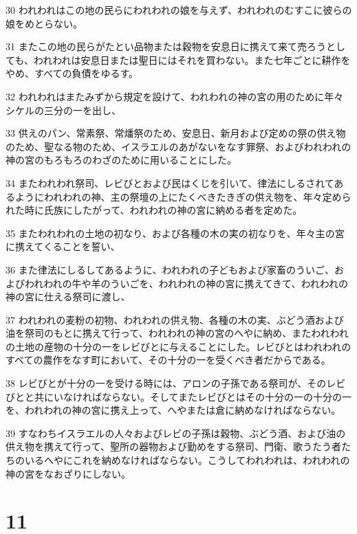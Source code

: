 \par 30 われわれはこの地の民らにわれわれの娘を与えず、われわれのむすこに彼らの娘をめとらない。
\par 31 またこの地の民らがたとい品物または穀物を安息日に携えて来て売ろうとしても、われわれは安息日または聖日にはそれを買わない。また七年ごとに耕作をやめ、すべての負債をゆるす。
\par 32 われわれはまたみずから規定を設けて、われわれの神の宮の用のために年々シケルの三分の一を出し、
\par 33 供えのパン、常素祭、常燔祭のため、安息日、新月および定めの祭の供え物のため、聖なる物のため、イスラエルのあがないをなす罪祭、およびわれわれの神の宮のもろもろのわざのために用いることにした。
\par 34 またわれわれ祭司、レビびとおよび民はくじを引いて、律法にしるされてあるようにわれわれの神、主の祭壇の上にたくべきたきぎの供え物を、年々定められた時に氏族にしたがって、われわれの神の宮に納める者を定めた。
\par 35 またわれわれの土地の初なり、および各種の木の実の初なりを、年々主の宮に携えてくることを誓い、
\par 36 また律法にしるしてあるように、われわれの子どもおよび家畜のういご、およびわれわれの牛や羊のういごを、われわれの神の宮に携えてきて、われわれの神の宮に仕える祭司に渡し、
\par 37 われわれの麦粉の初物、われわれの供え物、各種の木の実、ぶどう酒および油を祭司のもとに携えて行って、われわれの神の宮のへやに納め、またわれわれの土地の産物の十分の一をレビびとに与えることにした。レビびとはわれわれのすべての農作をなす町において、その十分の一を受くべき者だからである。
\par 38 レビびとが十分の一を受ける時には、アロンの子孫である祭司が、そのレビびとと共にいなければならない。そしてまたレビびとはその十分の一の十分の一を、われわれの神の宮に携え上って、へやまたは倉に納めなければならない。
\par 39 すなわちイスラエルの人々およびレビの子孫は穀物、ぶどう酒、および油の供え物を携えて行って、聖所の器物および勤めをする祭司、門衛、歌うたう者たちのいるへやにこれを納めなければならない。こうしてわれわれは、われわれの神の宮をなおざりにしない。

\chapter{11}

